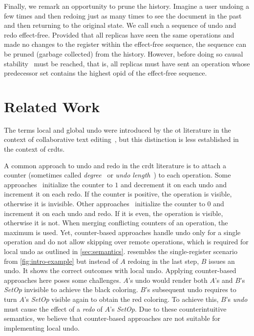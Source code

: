 \documentclass[sigplan,10pt]{acmart}
\newcommand{\setopkind}{\textit{SetOp}}
\begin{document}
Finally, we remark an opportunity to prune the history.
Imagine a user undoing a few times and then redoing just as many times
to see the document in the past and then returning to the original state.
We call such a sequence of undo and redo effect-free.
Provided that all replicas have seen the same operations and made no
changes to the register within the effect-free sequence,
the sequence can be pruned (garbage collected) from the history.
However, before doing so causal stability~\cite{baquero2017pure}
must be reached, that is, all
replicas must have sent an operation whose predecessor set contains the
highest \gls*{opid} of the effect-free sequence.

\section{Related Work}\label{sec:related-work}

The terms local and global undo were introduced by the \acrlong{ot}
literature in the context of collaborative text
editing~\cite{sun2000undo,ressel1999reducing, abowd1992giving},
but this distinction is less established in the context of \glspl{crdt}.

A common approach to undo and redo in the \gls{crdt} literature is
to attach a counter
(sometimes called \emph{degree}~\cite{Weiss2010LogootUndo} or
\emph{undo length}~\cite{Brattli2021undo,Yu2019undo}) to each operation.
Some approaches~\cite{Weiss2010LogootUndo,Martin2010xml} initialize the
counter to $1$ and decrement it on each undo and increment it on each redo.
If the counter is positive, the operation is visible,
otherwise it is invisible.
Other approaches~\cite{Brattli2021undo,Yu2019undo} initialize the counter
to $0$ and increment it on each undo and redo.
If it is even, the operation is visible, otherwise it is not.
When merging conflicting counters of an operation, the maximum is used.
Yet, counter-based approaches handle undo only for a single operation
and do not allow skipping over remote operations, which is required
for local undo as outlined in \cref{sec:semantics}.
 resembles the single-register scenario from
\cref{fig:intro-example} but instead of $A$ redoing in the last step,
$B$ issues an undo. It shows the correct outcomes with local undo.
Applying counter-based approaches here poses some challenges.
$A$'s undo would render both $A$'s and $B$'s \setopkind{} invisible to
achieve the black coloring.
$B$'s subsequent undo requires to turn $A$'s \setopkind{} visible again to
obtain the red coloring.
To achieve this, $B$'s \emph{undo} must cause the effect of a \emph{redo}
of $A$'s \setopkind{}.
Due to these counterintuitive semantics,
we believe that counter-based approaches are not suitable
for implementing local undo.
\end{document}
